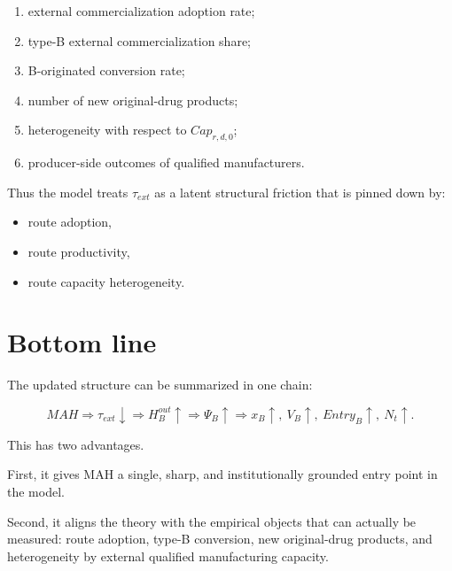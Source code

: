 \documentclass[12pt]{ctexart}
\begin{document}
\begin{enumerate}[leftmargin=2em]
    \item external commercialization adoption rate;
    \item type-B external commercialization share;
    \item B-originated conversion rate;
    \item number of new original-drug products;
    \item heterogeneity with respect to \(Cap_{r,d,0}\);
    \item producer-side outcomes of qualified manufacturers.
\end{enumerate}

Thus the model treats \(\tau_{ext}\) as a latent structural friction that is pinned down by:
\begin{itemize}[leftmargin=2em]
    \item route adoption,
    \item route productivity,
    \item route capacity heterogeneity.
\end{itemize}

\section{Bottom line}

The updated structure can be summarized in one chain:

\[
MAH
\Rightarrow
\tau_{ext}\downarrow
\Rightarrow
H_B^{out}\uparrow
\Rightarrow
\Psi_B\uparrow
\Rightarrow
x_B\uparrow,\ V_B\uparrow,\ Entry_B\uparrow,\ N_t\uparrow.
\]

This has two advantages.

First, it gives MAH a single, sharp, and institutionally grounded entry point in the model.

Second, it aligns the theory with the empirical objects that can actually be measured:
route adoption, type-B conversion, new original-drug products, and heterogeneity by external
qualified manufacturing capacity.
\end{document}

